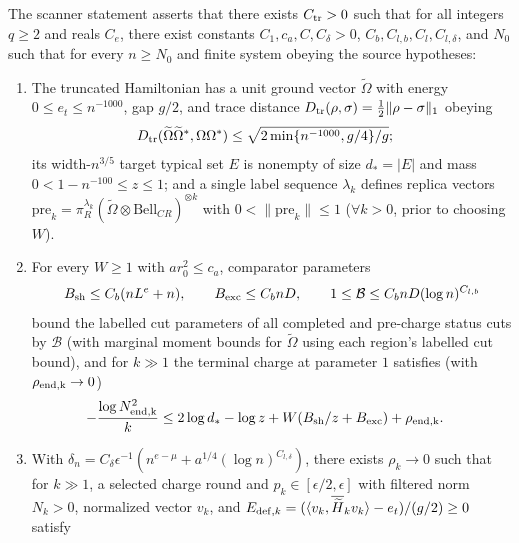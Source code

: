 \begin{definition}
    The scanner statement asserts that there exists $C_{\rm tr}>0$ such that for all integers $q\ge2$ and reals $C_e$, there exist constants $C_1,c_a,C,C_\delta>0$, $C_b,C_{l,b},C_l,C_{l,\delta}$, and $N_0$ such that for every $n\ge N_0$ and finite system obeying the source hypotheses:
    \begin{enumerate}
        \item The truncated Hamiltonian has a unit ground vector $\widetilde\Omega$ with energy $0\le e_t\le n^{-1000}$, gap $g/2$, and trace distance $D_{\rm tr}(\rho,\sigma)=\frac12\|\rho-\sigma\|_1$ obeying
              \begin{align}
                  D_{\rm tr}(\widetilde\Omega\widetilde\Omega^*,\Omega\Omega^*)
                   & \le\sqrt{2\min\{n^{-1000},g/4\}/g};
                  \label{eq:al_scanner_source_trace_distance}
              \end{align}
              its width-$n^{3/5}$ target typical set $E$ is nonempty of size $d_*=|E|$ and mass $0<1-n^{-100}\le z\le1$; and a single label sequence $\lambda_k$ defines replica vectors $\mathrm{pre}_k=\pi_R^{\lambda_k}(\widetilde\Omega\otimes\mathrm{Bell}_{CR})^{\otimes k}$ with $0<\|\mathrm{pre}_k\|\le1$ ($\forall k>0$, prior to choosing $W$).
        \item For every $W\ge1$ with $ar_0^2\le c_a$, comparator parameters
              \begin{align}
                  B_{\rm sh}\le C_b(nL^e+n),\qquad
                  B_{\rm exc}\le C_bnD,\qquad
                  1\le\mathcal B\le C_bnD(\log n)^{C_{l,b}} \notag
              \end{align}
              bound the labelled cut parameters of all completed and pre-charge status cuts by $\mathcal B$ (with marginal moment bounds for $\widetilde\Omega$ using each region's labelled cut bound), and for $k\gg1$ the terminal charge at parameter $1$ satisfies (with $\rho_{\rm end,k}\to0$)
              \begin{align}
                  -\frac{\log N_{\rm end,k}^2}{k}
                   & \le2\log d_*-\log z
                  +W(B_{\rm sh}/z+B_{\rm exc})+\rho_{\rm end,k}.\notag
              \end{align}
        \item With $\delta_n=C_\delta\epsilon^{-1}(n^{e-\mu}+a^{1/4}(\log n)^{C_{l,\delta}})$, there exists $\rho_k\to0$ such that for $k\gg1$, a selected charge round and $p_k\in[\epsilon/2,\epsilon]$ with filtered norm $N_k>0$, normalized vector $v_k$, and $E_{{\rm def},k}=(\langle v_k,\overline{\widetilde H}_k v_k\rangle-e_t)/(g/2)\ge0$ satisfy

\end{enumerate}
\end{definition}
